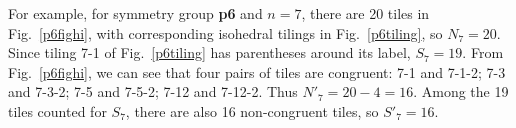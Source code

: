 \documentclass{ws-ijcga}
\begin{document}
\begin{table}[h]
\label{tbl6}
\end{table}



For example, for symmetry group {\bf p6} and $n = 7$, 
there are 20 tiles in Fig.~\ref{p6fighi}, with
corresponding isohedral tilings in Fig.~\ref{p6tiling}, so $N_7 = 20$. 
Since tiling 7-1 of Fig.~\ref{p6tiling} has parentheses
around its label, $S_7 = 19$. 
From Fig.~\ref{p6fighi}, 
we can see that four pairs of tiles are congruent: 7-1 and
7-1-2; 7-3 and 7-3-2; 7-5 and 7-5-2; 7-12 and 7-12-2. 
Thus $N'_7 = 20 - 4 = 16$. 
Among the 19 tiles counted for $S_7$, there are also 16 non-congruent tiles, so $S'_7 = 16$.
\end{document}
